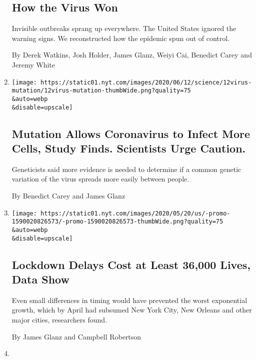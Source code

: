 \begin{enumerate}
{  \subsection{How the Virus Won}\label{how-the-virus-won}}

  Invisible outbreaks sprang up everywhere. The United States ignored
  the warning signs. We reconstructed how the epidemic spun out of
  control.

  By Derek Watkins, Josh Holder, James Glanz, Weiyi Cai, Benedict Carey
  and Jeremy White
\item
  \href{/2020/06/12/science/coronavirus-mutation-genetics-spike.html}{}

  \texttt{[image: https://static01.nyt.com/images/2020/06/12/science/12virus-mutation/12virus-mutation-thumbWide.png?quality=75\\\&auto=webp\\\&disable=upscale]}

  \hypertarget{mutation-allows-coronavirus-to-infect-more-cells-study-finds-scientists-urge-caution}{%
  \subsection{Mutation Allows Coronavirus to Infect More Cells, Study
  Finds. Scientists Urge
  Caution.}\label{mutation-allows-coronavirus-to-infect-more-cells-study-finds-scientists-urge-caution}}

  Geneticists said more evidence is needed to determine if a common
  genetic variation of the virus spreads more easily between people.

  By Benedict Carey and James Glanz
\item
  \href{/2020/05/20/us/coronavirus-distancing-deaths.html}{}

  \texttt{[image: https://static01.nyt.com/images/2020/05/20/us/-promo-1590020826573/-promo-1590020826573-thumbWide.png?quality=75\\\&auto=webp\\\&disable=upscale]}

  \hypertarget{lockdown-delays-cost-at-least-36000-lives-data-show}{%
  \subsection{Lockdown Delays Cost at Least 36,000 Lives, Data
  Show}\label{lockdown-delays-cost-at-least-36000-lives-data-show}}

  Even small differences in timing would have prevented the worst
  exponential growth, which by April had subsumed New York City, New
  Orleans and other major cities, researchers found.

  By James Glanz and Campbell Robertson
\item
  \href{/2020/05/07/us/new-york-city-coronavirus-outbreak.html}{}


\end{enumerate}
